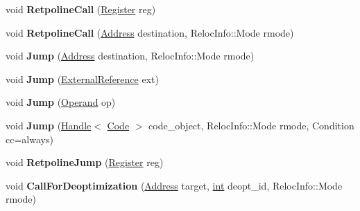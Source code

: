 \begin{DoxyCompactItemize}
\item 
\mbox{\label{classv8_1_1internal_1_1TurboAssembler_a2d59ed4d2e98e7f1d03809bba8820d03}} 
void {\bfseries Retpoline\+Call} (\mbox{\hyperlink{classv8_1_1internal_1_1Register}{Register}} reg)
\item 
\mbox{\label{classv8_1_1internal_1_1TurboAssembler_a49a2689540115fa18d706b746b02c281}} 
void {\bfseries Retpoline\+Call} (\mbox{\hyperlink{classuintptr__t}{Address}} destination, Reloc\+Info\+::\+Mode rmode)
\item 
\mbox{\label{classv8_1_1internal_1_1TurboAssembler_a0f0c1f86fcad4531c8465dae5bb315d4}} 
void {\bfseries Jump} (\mbox{\hyperlink{classuintptr__t}{Address}} destination, Reloc\+Info\+::\+Mode rmode)
\item 
\mbox{\label{classv8_1_1internal_1_1TurboAssembler_ac4222a9f820199e9905331947985ebba}} 
void {\bfseries Jump} (\mbox{\hyperlink{classv8_1_1internal_1_1ExternalReference}{External\+Reference}} ext)
\item 
\mbox{\label{classv8_1_1internal_1_1TurboAssembler_a8fcf067ab6a7ee6985440d4eeb959697}} 
void {\bfseries Jump} (\mbox{\hyperlink{classv8_1_1internal_1_1Operand}{Operand}} op)
\item 
\mbox{\label{classv8_1_1internal_1_1TurboAssembler_a00254b055098326401a3005c5c265f41}} 
void {\bfseries Jump} (\mbox{\hyperlink{classv8_1_1internal_1_1Handle}{Handle}}$<$ \mbox{\hyperlink{classv8_1_1internal_1_1Code}{Code}} $>$ code\+\_\+object, Reloc\+Info\+::\+Mode rmode, Condition cc=always)
\item 
\mbox{\label{classv8_1_1internal_1_1TurboAssembler_a1bbadd6c0afeea9eab35a7e8508444cb}} 
void {\bfseries Retpoline\+Jump} (\mbox{\hyperlink{classv8_1_1internal_1_1Register}{Register}} reg)
\item 
\mbox{\label{classv8_1_1internal_1_1TurboAssembler_a8fe9aeaba65f21a5f48bbf9ad66fa18d}} 
void {\bfseries Call\+For\+Deoptimization} (\mbox{\hyperlink{classuintptr__t}{Address}} target, \mbox{\hyperlink{classint}{int}} deopt\+\_\+id, Reloc\+Info\+::\+Mode rmode)

\end{DoxyCompactItemize}
